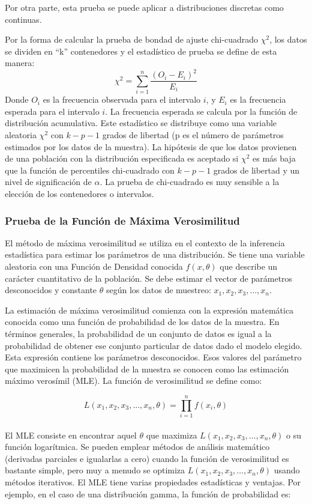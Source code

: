 \documentclass[]{article}
\begin{document}
Por otra parte, esta prueba se puede aplicar a distribuciones discretas
como continuas.

Por la forma de calcular la prueba de bondad de ajuste chi-cuadrado
\(\chi^2\), los datos se dividen en ``k'' contenedores y el estadístico
de prueba se define de esta manera:
\[\chi^2=\sum_{i=1}^{n}\frac{(O_i-E_i)^2}{E_i}\] Donde \(O_i\) es la
frecuencia observada para el intervalo \(i\), y \(E_i\) es la frecuencia
esperada para el intervalo \(i\). La frecuencia esperada se calcula por
la función de distribución acumulativa. Este estadístico se distribuye
como una variable aleatoria \(\chi^2\) con \(k-p-1\) grados de libertad
(p es el número de parámetros estimados por los datos de la muestra). La
hipótesis de que los datos provienen de una población con la
distribución especificada es aceptado si \(\chi^2\) es más baja que la
función de percentiles chi-cuadrado con \(k-p-1\) grados de libertad y
un nivel de significación de \(\alpha\). La prueba de chi-cuadrado es
muy sensible a la elección de los contenedores o intervalos.

\hypertarget{prueba-de-la-funcion-de-maxima-verosimilitud}{%
\subsubsection{Prueba de la Función de Máxima
Verosimilitud}\label{prueba-de-la-funcion-de-maxima-verosimilitud}}

El método de máxima verosimilitud se utiliza en el contexto de la
inferencia estadística para estimar los parámetros de una distribución.
Se tiene una variable aleatoria con una Función de Densidad conocida
\(f(x,\theta)\) que describe un carácter cuantitativo de la población.
Se debe estimar el vector de parámetros desconocidos y constante
\(\theta\) según los datos de muestreo: \(x_1,x_2,x_3,…,x_n\).

La estimación de máxima verosimilitud comienza con la expresión
matemática conocida como una función de probabilidad de los datos de la
muestra. En términos generales, la probabilidad de un conjunto de datos
es igual a la probabilidad de obtener ese conjunto particular de datos
dado el modelo elegido. Esta expresión contiene los parámetros
desconocidos. Esos valores del parámetro que maximicen la probabilidad
de la muestra se conocen como las estimación máximo verosímil (MLE). La
función de verosimilitud se define como:

\[L(x_1, x_2, x_3, ..., x_n, \theta)=\prod_{i=1}^{n}f(x_i, \theta)\]\\
El MLE consiste en encontrar aquel \(\theta\) que maximiza
\(L(x_1,x_2,x_3,…,x_n,\theta)\) o su función logarítmica. Se pueden
emplear métodos de análisis matemático (derivadas parciales e igualarlas
a cero) cuando la función de verosimilitud es bastante simple, pero muy
a menudo se optimiza \(L(x_1,x_2,x_3,…,x_n,\theta)\) usando métodos
iterativos. El MLE tiene varias propiedades estadísticas y ventajas. Por
ejemplo, en el caso de una distribución gamma, la función de
probabilidad es:
\end{document}
